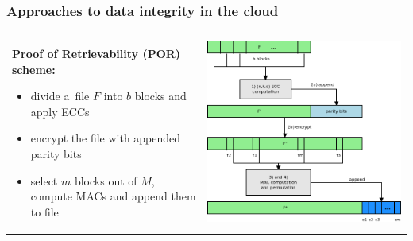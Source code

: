 \documentclass[9pt]{beamer}
\begin{document}
\begin{frame}
\frametitle{\hspace{5mm} \textbf{Approaches to data integrity in the cloud}}
\begin{block}{}
\begin{tabular}{l l}
	\begin{minipage}{0.4\textwidth}
  	\textbf{Proof of Retrievability (POR) scheme:}
	\begin{itemize}
		\item divide a~file $F$ into $b$ blocks and apply ECCs
		\item encrypt the file with appended parity bits
		\item select $m$ blocks out of $M$, compute MACs and append them to file
	\end{itemize}
	\end{minipage}
	&
	\begin{minipage}{0.6\textwidth}
		\includegraphics[width=0.5\paperwidth]{img/por-schematic.png}
	\end{minipage}
\end{tabular}
\end{block}
\end{frame}

\end{document}
